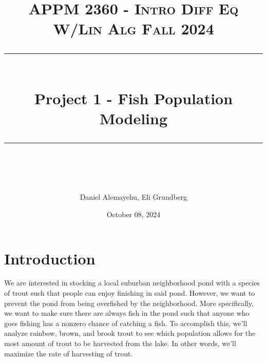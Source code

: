 \documentclass[letterpaper,12pt]{article}
\title{
\normalfont \normalsize 
\textsc{APPM 2360 - Intro Diff Eq W/Lin Alg \hfill Fall 2024} \\
[10pt] 
\rule{\linewidth}{0.5pt} \\[6pt] 
\huge Project 1 - Fish Population Modeling \\
\rule{\linewidth}{2pt}  \\[10pt]
}
\date{October 08, 2024}
\author{Daniel Alemayehu, Eli Grundberg}
\begin{document}
\begin{titlingpage}
\maketitle
\end{titlingpage}
\newpage
\tableofcontents
\newpage

\section{Introduction}
We are interested in stocking a local suburban neighborhood pond with a species of trout such that people can enjoy finishing in said pond. 
However, we want to prevent the pond from being overfished by the neighborhood.
More specifically, we want to make sure there are always fish in the pond such that anyone who goes fishing has a nonzero chance of catching a fish. 
To accomplish this, we'll analyze rainbow, brown, and brook trout to see which population allows for the most amount of trout to be harvested from the lake.
In other words, we'll maximize the rate of harvesting of trout.
\end{document}
